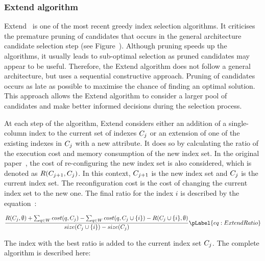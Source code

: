 \subsubsection{Extend algorithm}
Extend~\citep{Extend} is one of the most recent greedy index selection algorithms. It criticises the premature pruning of candidates that occurs in the general architecture candidate selection step (see Figure~). Although pruning speeds up the algorithms, it usually leads to sub-optimal selection as pruned candidates may appear to be useful. Therefore, the Extend algorithm does not follow a general architecture, but uses a sequential constructive approach. Pruning of candidates occurs as late as possible to maximise the chance of finding an optimal solution. This approach allows the Extend algorithm to consider a larger pool of candidates and make better informed decisions during the selection process.

At each step of the algorithm, Extend considers either an addition of a single-column index to the current set of indexes $C_{j}$ or an extension of one of the existing indexes in $C_{j}$ with a new attribute. It does so by calculating the ratio of the execution cost and memory consumption of the new index set. In the original paper~\citep{Extend}, the cost of re-configuring the new index set is also considered, which is denoted as $R(C_{j+1}, C_{j})$. In this context, $C_{j+1}$ is the new index set and $C_{j}$ is the current index set. The reconfiguration cost is the cost of changing the current index set to the new one. The final ratio for the index $i$ is described by the equation~:

\begin{gather}
    \frac{R(\FIndexConfigurationSet_{j}, \emptyset) + \sum_{q \in W} cost(q, \FIndexConfigurationSet_{j}) - \sum_{q \in W} cost(q, \FIndexConfigurationSet_{j} \cup \{i\}) - R(\FIndexConfigurationSet_{j} \cup \{i\}, \emptyset)}{size(\FIndexConfigurationSet_{j} \cup \{i\}) - size(\FIndexConfigurationSet_{j})} \pLabel{eq:ExtendRatio}
\end{gather}

The index with the best ratio is added to the current index set $C_{j}$. The complete algorithm is described here:

